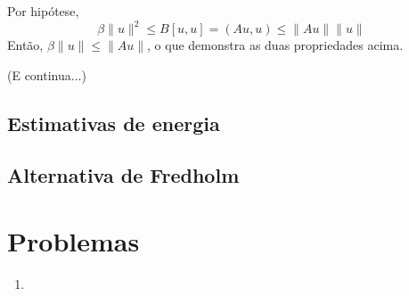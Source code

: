 \documentclass[a4paper, 11pt]{book}
\begin{document}
Por hipótese,
\[
\beta \|u\|^2 \leq B[u,u] = (Au, u) \leq \|Au\| \|u\|	
\]
Então, $\beta \| u\| \leq \| Au \|$, o que demonstra as duas propriedades acima.

(E continua...)



\subsection{Estimativas de energia}
\subsection{Alternativa de Fredholm}



\section{Problemas}

\begin{enumerate}
	\item 
\end{enumerate}
\end{document}
